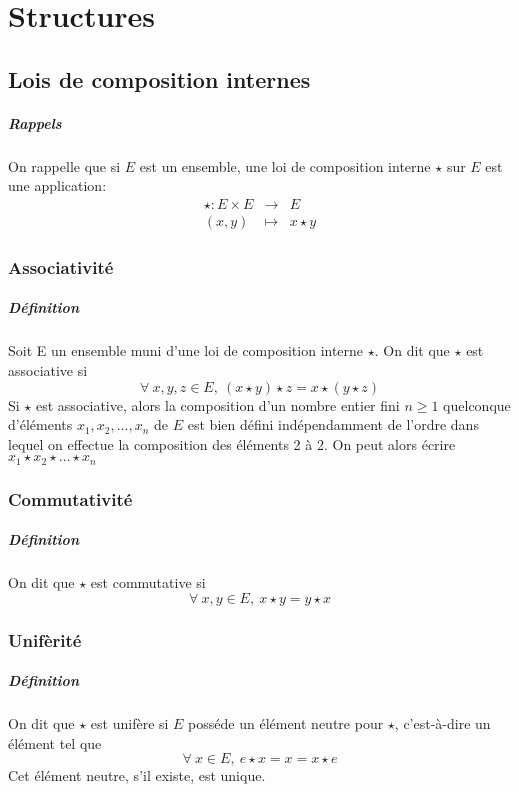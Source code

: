 \chapter{Structures}
%
%
\section{Lois de composition internes}
%
%
\paragraph{Rappels} On rappelle que si $E$ est un ensemble, une loi de composition interne $\star$ sur $E$ est une application:
\begin{eqnarray*}
\star{}:  E \times E &\rightarrow& E \\
 (x, y) &\mapsto& x \star y
\end{eqnarray*}

%
\subsection{Associativité}
%
\paragraph{Définition} Soit E un ensemble muni d'une loi de composition interne $\star$. On dit que $\star$ est associative si
$$ \forall ~ x, y, z \in E, ~ (x \star y) \star z = x \star (y \star z)$$
Si $\star$ est associative, alors la composition d'un nombre entier fini $n \geq 1$ quelconque d'éléments $x_1, x_2, \ldots , x_n$ de $E$ est bien défini indépendamment de l'ordre dans lequel on effectue la composition des éléments 2 à 2. On peut alors écrire $x_1 \star x_2 \star \ldots \star x_n$

%
\subsection{Commutativité}
%
\paragraph{Définition} On dit que $\star$ est commutative si
$$ \forall ~ x, y \in E, ~ x \star y = y \star x$$

%
\subsection{Unifèrité}
%
\paragraph{Définition} On dit que $\star$ est unifère si $E$ posséde un élément neutre pour $\star$, c'est-à-dire un élément tel que
$$\forall ~ x \in E, ~ e \star x = x = x \star e$$
Cet élément neutre, s'il existe, est unique.

